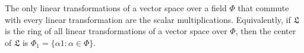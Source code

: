 The only linear transformations of a vector space over a field $\Phi$ that commute with every linear transformation are the scalar multiplications. Equivalently, if $\mathfrak{L}$ is the ring of all linear transformations of a vector space over $\Phi$, then the center of $\mathfrak{L}$ is $\Phi_1 = \{\alpha 1 : \alpha \in \Phi\}$.
